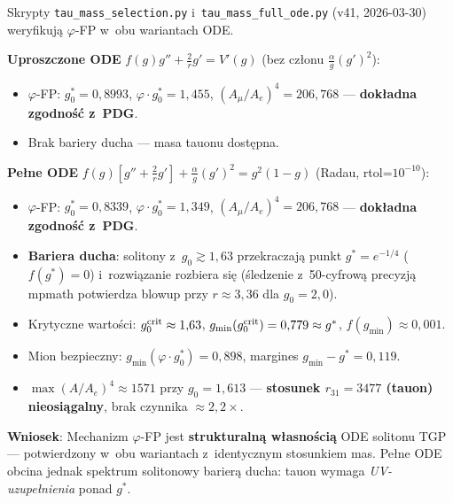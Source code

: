 \begin{remark}%
\label{rem:J-v41-verification}
Skrypty \texttt{tau\_mass\_selection.py} i~\texttt{tau\_mass\_full\_ode.py}
(v41, 2026-03-30) weryfikują $\varphi$-FP w~obu wariantach ODE.

\medskip\noindent
\textbf{Uproszczone ODE} $f(g)g''+\tfrac{2}{r}g'=V'(g)$
(bez członu $\tfrac{\alpha}{g}(g')^2$):
\begin{itemize}[nosep]
  \item $\varphi$-FP: $g_0^* = 0{,}8993$, $\varphi\cdot g_0^* = 1{,}455$,
    $(A_\mu/A_e)^4 = 206{,}768$ --- \textbf{dokładna zgodność z~PDG}.
  \item Brak bariery ducha --- masa tauonu dostępna.
\end{itemize}

\noindent
\textbf{Pełne ODE} $f(g)[g''+\tfrac{2}{r}g']+\tfrac{\alpha}{g}(g')^2=g^2(1-g)$
(Radau, rtol=$10^{-10}$):
\begin{itemize}[nosep]
  \item $\varphi$-FP: $g_0^* = 0{,}8339$, $\varphi\cdot g_0^* = 1{,}349$,
    $(A_\mu/A_e)^4 = 206{,}768$ --- \textbf{dokładna zgodność z~PDG}.
  \item \textbf{Bariera ducha}: solitony z~$g_0 \gtrsim 1{,}63$ przekraczają
    punkt $g^* = e^{-1/4}$ ($f(g^*)=0$) i~rozwiązanie rozbiera się
    (śledzenie z~50-cyfrową precyzją mpmath potwierdza blowup
    przy $r \approx 3{,}36$ dla $g_0 = 2{,}0$).
  \item Krytyczne wartości: $g_0^{\rm crit} \approx 1{,}63$,
    $g_{\min}(g_0^{\rm crit}) = 0{,}779 \approx g^*$,
    $f(g_{\min}) \approx 0{,}001$.
  \item Mion bezpieczny: $g_{\min}(\varphi\cdot g_0^*) = 0{,}898$,
    margines $g_{\min} - g^* = 0{,}119$.
  \item $\max (A/A_e)^4 \approx 1571$ przy $g_0 = 1{,}613$ ---
    \textbf{stosunek $r_{31} = 3477$ (tauon) nieosiągalny},
    brak czynnika $\approx 2{,}2\times$.
\end{itemize}

\medskip\noindent
\textbf{Wniosek}: Mechanizm $\varphi$-FP jest \textbf{strukturalną własnością}
ODE solitonu TGP --- potwierdzony w~obu wariantach z~identycznym stosunkiem mas.
Pełne ODE obcina jednak spektrum solitonowy barierą ducha: tauon wymaga
\emph{UV-uzupełnienia} ponad $g^*$.


\end{remark}
